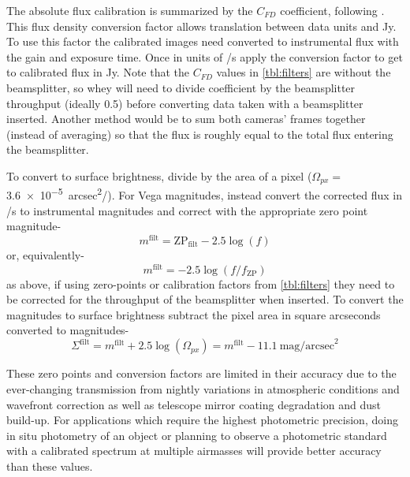 The absolute flux calibration is summarized by the $C_{FD}$ coefficient, following \citet{gordon_james_2022}. This flux density conversion factor allows translation between data units and \si{Jy}. To use this factor the calibrated images need converted to instrumental flux with the gain and exposure time. Once in units of \si{\electron/s} apply the conversion factor to get to calibrated flux in \si{Jy}. Note that the $C_{FD}$ values in \autoref{tbl:filters} are without the beamsplitter, so whey will need to divide coefficient by the beamsplitter throughput (ideally 0.5) before converting data taken with a beamsplitter inserted. Another method would be to sum both cameras' frames together (instead of averaging) so that the flux is roughly equal to the total flux entering the beamsplitter.

To convert to surface brightness, divide by the area of a pixel ($\Omega_{px}=$\SI{3.6e-5}{arcsec^2/\pixel}). For Vega magnitudes, instead convert the corrected flux in \si{\electron/s} to instrumental magnitudes and correct with the appropriate zero point magnitude-
\begin{equation}
    m^\mathrm{filt}=\mathrm{ZP}_\mathrm{filt} - 2.5\log{\left(f\right)}
\end{equation}
or, equivalently-
\begin{equation}
    m^\mathrm{filt}=-2.5\log{\left(f/f_\mathrm{ZP}\right)}
\end{equation}
as above, if using zero-points or calibration factors from \autoref{tbl:filters} they need to be corrected for the throughput of the beamsplitter when inserted.
To convert the magnitudes to surface brightness subtract the pixel area in square arcseconds converted to magnitudes-
\begin{equation}
    \label{eqn:surf_bright}
    \Sigma^\mathrm{filt} = m^\mathrm{filt} + 2.5\log{\left(\Omega_{px}\right)} = m^\mathrm{filt} - 11.1~\mathrm{mag/arcsec}^2
\end{equation}

These zero points and conversion factors are limited in their accuracy due to the ever-changing transmission from nightly variations in  atmospheric conditions and wavefront correction as well as telescope mirror coating degradation and dust build-up. For applications which require the highest photometric precision, doing in situ photometry of an object or planning to observe a photometric standard with a calibrated spectrum at multiple airmasses will provide better accuracy than these values.

